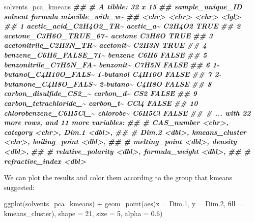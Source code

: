 \documentclass[
]{krantz}
\newenvironment{Shaded}{\begin{snugshade}}{\end{snugshade}}
\newcommand{\AttributeTok}[1]{\textcolor[rgb]{0.77,0.63,0.00}{#1}}
\newcommand{\DecValTok}[1]{\textcolor[rgb]{0.00,0.00,0.81}{#1}}
\newcommand{\DocumentationTok}[1]{\textcolor[rgb]{0.56,0.35,0.01}{\textbf{\textit{#1}}}}
\newcommand{\FloatTok}[1]{\textcolor[rgb]{0.00,0.00,0.81}{#1}}
\newcommand{\FunctionTok}[1]{\textcolor[rgb]{0.00,0.00,0.00}{#1}}
\newcommand{\NormalTok}[1]{#1}
\newcommand{\SpecialCharTok}[1]{\textcolor[rgb]{0.00,0.00,0.00}{#1}}
\begin{document}
\begin{Shaded}
\begin{Highlighting}[]
\NormalTok{solvents\_pca\_kmeans}
\DocumentationTok{\#\# \# A tibble: 32 x 15}
\DocumentationTok{\#\#    sample\_unique\_ID       solvent   formula miscible\_with\_w\textasciitilde{}}
\DocumentationTok{\#\#    \textless{}chr\textgreater{}                  \textless{}chr\textgreater{}     \textless{}chr\textgreater{}   \textless{}lgl\textgreater{}           }
\DocumentationTok{\#\#  1 acetic\_acid\_C2H4O2\_TR\textasciitilde{} acetic\_a\textasciitilde{} C2H4O2  TRUE            }
\DocumentationTok{\#\#  2 acetone\_C3H6O\_TRUE\_67\textasciitilde{} acetone   C3H6O   TRUE            }
\DocumentationTok{\#\#  3 acetonitrile\_C2H3N\_TR\textasciitilde{} acetonit\textasciitilde{} C2H3N   TRUE            }
\DocumentationTok{\#\#  4 benzene\_C6H6\_FALSE\_71\textasciitilde{} benzene   C6H6    FALSE           }
\DocumentationTok{\#\#  5 benzonitrile\_C7H5N\_FA\textasciitilde{} benzonit\textasciitilde{} C7H5N   FALSE           }
\DocumentationTok{\#\#  6 1{-}butanol\_C4H10O\_FALS\textasciitilde{} 1{-}butanol C4H10O  FALSE           }
\DocumentationTok{\#\#  7 2{-}butanone\_C4H8O\_FALS\textasciitilde{} 2{-}butano\textasciitilde{} C4H8O   FALSE           }
\DocumentationTok{\#\#  8 carbon\_disulfide\_CS2\_\textasciitilde{} carbon\_d\textasciitilde{} CS2     FALSE           }
\DocumentationTok{\#\#  9 carbon\_tetrachloride\_\textasciitilde{} carbon\_t\textasciitilde{} CCl4    FALSE           }
\DocumentationTok{\#\# 10 chlorobenzene\_C6H5Cl\_\textasciitilde{} chlorobe\textasciitilde{} C6H5Cl  FALSE           }
\DocumentationTok{\#\# \# ... with 22 more rows, and 11 more variables:}
\DocumentationTok{\#\# \#   CAS\_number \textless{}chr\textgreater{}, category \textless{}chr\textgreater{}, Dim.1 \textless{}dbl\textgreater{},}
\DocumentationTok{\#\# \#   Dim.2 \textless{}dbl\textgreater{}, kmeans\_cluster \textless{}chr\textgreater{}, boiling\_point \textless{}dbl\textgreater{},}
\DocumentationTok{\#\# \#   melting\_point \textless{}dbl\textgreater{}, density \textless{}dbl\textgreater{},}
\DocumentationTok{\#\# \#   relative\_polarity \textless{}dbl\textgreater{}, formula\_weight \textless{}dbl\textgreater{},}
\DocumentationTok{\#\# \#   refractive\_index \textless{}dbl\textgreater{}}
\end{Highlighting}
\end{Shaded}

We can plot the results and color them according to the group that kmeans suggested:

\begin{Shaded}
\begin{Highlighting}[]
\FunctionTok{ggplot}\NormalTok{(solvents\_pca\_kmeans) }\SpecialCharTok{+}
  \FunctionTok{geom\_point}\NormalTok{(}\FunctionTok{aes}\NormalTok{(}\AttributeTok{x =}\NormalTok{ Dim}\FloatTok{.1}\NormalTok{, }\AttributeTok{y =}\NormalTok{ Dim}\FloatTok{.2}\NormalTok{, }\AttributeTok{fill =}\NormalTok{ kmeans\_cluster), }\AttributeTok{shape =} \DecValTok{21}\NormalTok{, }\AttributeTok{size =} \DecValTok{5}\NormalTok{, }\AttributeTok{alpha =} \FloatTok{0.6}\NormalTok{)}
\end{Highlighting}
\end{Shaded}
\end{document}
